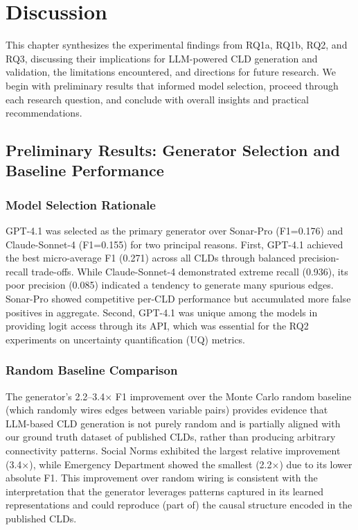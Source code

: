 \section{Discussion}
\label{sec:discussion}

This chapter synthesizes the experimental findings from RQ1a, RQ1b, RQ2, and RQ3, discussing their implications for LLM-powered CLD generation and validation, the limitations encountered, and directions for future research. We begin with preliminary results that informed model selection, proceed through each research question, and conclude with overall insights and practical recommendations.

\subsection{Preliminary Results: Generator Selection and Baseline Performance}
\label{sec:discussion_preliminaries}

\subsubsection{Model Selection Rationale}

GPT-4.1 was selected as the primary generator over Sonar-Pro (F1=0.176) and Claude-Sonnet-4 (F1=0.155) for two principal reasons. First, GPT-4.1 achieved the best micro-average F1 (0.271) across all CLDs through balanced precision-recall trade-offs. While Claude-Sonnet-4 demonstrated extreme recall (0.936), its poor precision (0.085) indicated a tendency to generate many spurious edges. Sonar-Pro showed competitive per-CLD performance but accumulated more false positives in aggregate. Second, GPT-4.1 was unique among the models in providing logit access through its API, which was essential for the RQ2 experiments on uncertainty quantification (UQ) metrics.

\subsubsection{Random Baseline Comparison}

The generator's 2.2--3.4$\times$ F1 improvement over the Monte Carlo random baseline (which randomly wires edges between variable pairs) provides evidence that LLM-based CLD generation is not purely random and is partially aligned with our ground truth dataset of published CLDs, rather than producing arbitrary connectivity patterns. Social Norms exhibited the largest relative improvement (3.4$\times$), while Emergency Department showed the smallest (2.2$\times$) due to its lower absolute F1. This improvement over random wiring is consistent with the interpretation that the generator leverages patterns captured in its learned representations and could reproduce (part of) the causal structure encoded in the published CLDs.

